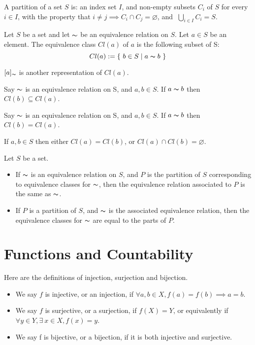 \documentclass[a4paper]{article}
\begin{document}
\begin{defi}[Partition]
A partition of a set $S$ is: an index set $I$, and non-empty subsets $C_i$ of $S$ for every $i \in I$, with the property that $i \neq j \implies C_i \cap C_j = \varnothing$, and 􏰛$\bigcup_{i \in I}C_i = S$.
\end{defi}

\begin{defi}
Let $S$ be a set and let $\thicksim$ be an equivalence relation on $S$. Let $a \in S$ be an element. The equivalence class $Cl(a)$ of $a$ is the following subset of S:
$$Cl(a) := \{\ b \in S \mid a \thicksim b\ \}$$
\end{defi}
\begin{notation}
$[a]_{\thicksim}$ is another representation of $Cl(a)$.
\end{notation}

\begin{lemma}
Say $\thicksim$ is an equivalence relation on S, and $a, b \in S$. If $a \thicksim b$ then $Cl(b) \subseteq Cl(a)$.
\end{lemma}
\begin{cor}
Say $\thicksim$ is an equivalence relation on S, and $a, b \in S$. If $a \thicksim b$ then $Cl(b) = Cl(a)$.
\end{cor}

\begin{prop}
If $a, b \in S$ then either $Cl(a) = Cl(b)$, or $Cl(a) \cap Cl(b) = \varnothing$.
\end{prop}

\begin{thm}
Let $S$ be a set.
\begin{itemize}
	\item If $\thicksim$ is an equivalence relation on $S$, and $P$ is the partition of $S$ corresponding to equivalence classes for $\thicksim$, then the equivalence relation associated to $P$ is the same as $\thicksim$.
	\item If $P$ is a partition of $S$, and $\thicksim$ is the associated equivalence relation, then the equivalence classes for $\thicksim$ are equal to the parts of $P$.
\end{itemize}
\end{thm}

\section{Functions and Countability}
\begin{defi}
Here are the definitions of injection, surjection and bijection.
\begin{itemize}
	\item We say $f$ is injective, or an injection, if $\forall a,b \in X, f(a) = f(b) \implies a = b$.
	\item We say $f$ is surjective, or a surjection, if $f(X) = Y$, or equivalently if $\forall y \in Y, \exists \ x \in X, f(x) = y$.
	\item We say f is bijective, or a bijection, if it is both injective and surjective.
\end{itemize}
\end{defi}
\end{document}
